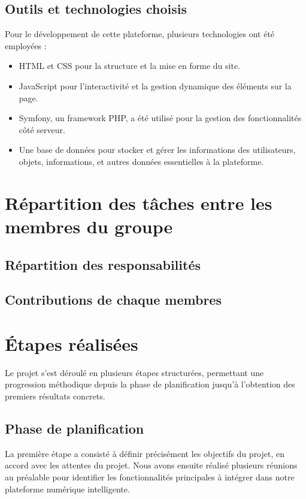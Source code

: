\documentclass[a4paper,12pt]{report}
\begin{document}
	\subsection{Outils et technologies choisis}
	
	Pour le développement de cette plateforme, plusieurs technologies ont été employées :
	
	\begin{itemize}
		\item  HTML et CSS pour la structure et la mise en forme du site.
		\item JavaScript pour l'interactivité et la gestion dynamique des éléments sur la page.
		\item Symfony, un framework PHP, a été utilisé pour la gestion des fonctionnalités côté serveur.
		\item Une base de données pour stocker et gérer les informations des utilisateurs, objets, informations, et autres données essentielles à la plateforme.
	\end{itemize}
	
	\newpage
	
	\section{Répartition des tâches entre les membres du groupe}
	
	\subsection{Répartition des responsabilités}
	
	\subsection{Contributions de chaque membres}
	
	\newpage
	
	\section{Étapes réalisées}
	
	Le projet s'est déroulé en plusieurs étapes structurées, permettant une progression méthodique depuis la phase de planification jusqu'à l'obtention des premiers résultats concrets.
	
	\subsection{Phase de planification}
	La première étape a consisté à définir précisément les objectifs du projet, en accord avec les attentes du projet. Nous avons ensuite réalisé plusieurs réunions au préalable pour identifier les fonctionnalités principales à intégrer dans notre plateforme numérique intelligente.
	
\end{document}
